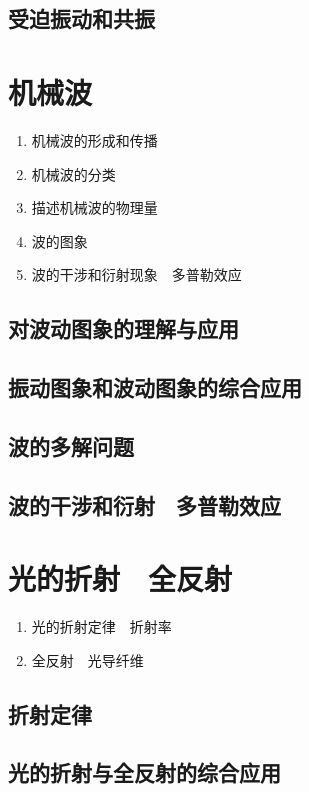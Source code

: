 \documentclass[cn,11pt,mac, simple]{elegantbook}
\begin{document}
\clearpage\section{受迫振动和共振}

\chapter{机械波}
\begin{enumerate}
   \item 机械波的形成和传播
   \item 机械波的分类
   \item 描述机械波的物理量
   \item 波的图象
   \item 波的干涉和衍射现象　多普勒效应
\end{enumerate}

\clearpage\section{对波动图象的理解与应用}

\clearpage\section{振动图象和波动图象的综合应用}

\clearpage\section{波的多解问题}

\clearpage\section{波的干涉和衍射　多普勒效应}

\chapter{光的折射　全反射}
\begin{enumerate}
   \item 光的折射定律　折射率
   \item 全反射　光导纤维
\end{enumerate}

\clearpage\section{折射定律}

\clearpage\section{光的折射与全反射的综合应用}
\end{document}
